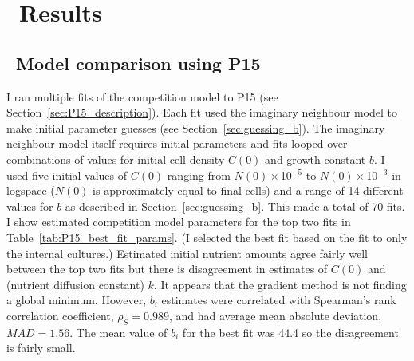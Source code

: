 \graphicspath{{images/}}

\section{\thesection~Results}
\label{sec:results}






\subsection{\thesubsection~Model comparison using P15}
\label{sec:P15_fit}

I ran multiple fits of the competition model to P15 (see
Section~\ref{sec:P15_description}). Each fit used the imaginary
neighbour model to make initial parameter guesses (see
Section~\ref{sec:guessing_b}). The imaginary neighbour model itself
requires initial parameters and fits looped over combinations of
values for initial cell density \(C(0)\) and growth constant \(b\). I
used five initial values of \(C(0)\) ranging from
\(N(0)\times\)10\(^{-5}\) to \(N(0)\times\)10\(^{-3}\) in logspace
(\(N(0)\) is approximately equal to final cells) and a range of 14
different values for \(b\) as described in
Section~\ref{sec:guessing_b}. This made a total of 70 fits. I show
estimated competition model parameters for the top two fits in
Table~\ref{tab:P15_best_fit_params}. (I selected the best fit based on
the fit to only the internal cultures.) Estimated initial nutrient
amounts agree fairly well between the top two fits but there is
disagreement in estimates of \(C(0)\) and (nutrient diffusion
constant) \(k\). It appears that the gradient method is not finding a
global minimum. However, \(b_{i}\) estimates were correlated with
Spearman's rank correlation coefficient, \(\rho_{S} = 0.989\), and had
average mean absolute deviation, \(MAD = 1.56\). The mean value of
\(b_{i}\) for the best fit was 44.4 so the disagreement is fairly
small.

